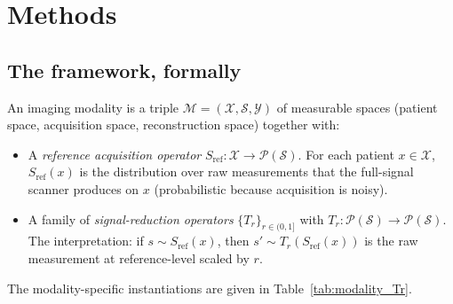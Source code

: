\documentclass[twoside,11pt]{article}
\newcommand{\Sref}{S_{\textrm{ref}}}
\begin{document}
\section{Methods}

\subsection{The framework, formally}
\label{sec:framework}

An imaging modality is a triple $\mathcal{M} = (\mathcal{X}, \mathcal{S}, \mathcal{Y})$ of measurable spaces (patient space, acquisition space, reconstruction space) together with:

\begin{itemize}
    \item A \emph{reference acquisition operator} $\Sref: \mathcal{X} \to \mathcal{P}(\mathcal{S})$. For each patient $x \in \mathcal{X}$, $\Sref(x)$ is the distribution over raw measurements that the full-signal scanner produces on $x$ (probabilistic because acquisition is noisy).
    \item A family of \emph{signal-reduction operators} $\{T_r\}_{r \in (0,1]}$ with $T_r: \mathcal{P}(\mathcal{S}) \to \mathcal{P}(\mathcal{S})$. The interpretation: if $s \sim \Sref(x)$, then $s' \sim T_r(\Sref(x))$ is the raw measurement at reference-level scaled by $r$.
\end{itemize}

The modality-specific instantiations are given in Table~\ref{tab:modality_Tr}.
\end{document}
